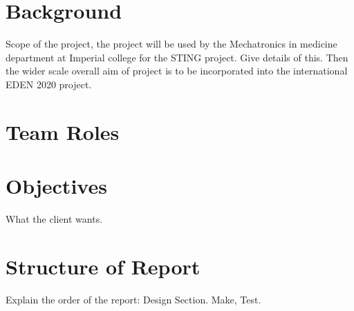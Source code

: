 \section{Background}
\label{sec:background}
Scope of the project, the project will be used by the Mechatronics in medicine department at Imperial college for the STING project. Give details of this. Then the wider scale overall aim of project is to be incorporated into the international EDEN 2020 project.

\section{Team Roles}
\label{sec:team_roles}


\section{Objectives}
\label{sec:objectives}
What the client wants.


\section{Structure of Report}
\label{sec:structure_of_report}
Explain the order of the report: Design Section. Make, Test.
